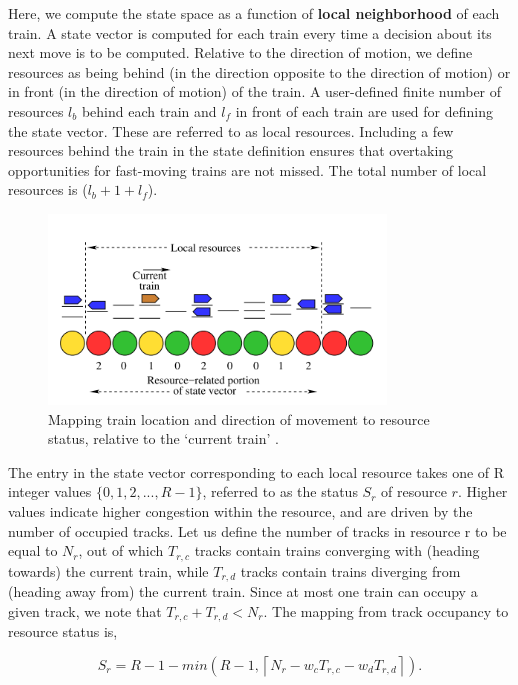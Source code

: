 Here, we compute the state space as a function of \textbf{local neighborhood} of each
train.
A state vector is computed for each train every time a
decision about its next move is to be computed. Relative to
the direction of motion, we define resources as being behind
(in the direction opposite to the direction of motion) or in
front (in the direction of motion) of the train. A user-defined
finite number of resources $ l_b $ behind each train and $ l_f $ in
front of each train are used for defining the state vector. These
are referred to as local resources. Including a few resources
behind the train in the state definition ensures that overtaking
opportunities for fast-moving trains are not missed. The total
number of local resources is ($ l_b + 1 + l_f $). 
\vspace{0.2cm}
\begin{figure}[h]
    \centering
    \includegraphics[width=0.8\textwidth]{report2}
    \caption{ Mapping train location and direction of movement to resource
    status, relative to the ‘current train’ \cite{ARTICLE:1}.  }
    \label{image-myimage}
\end{figure}


The entry in the state vector corresponding to each local
resource takes one of R integer values $ \{0, 1, 2,..., R-1\} $,
referred to as the status $S_r$ of resource $r$. Higher values
indicate higher congestion within the resource, and are driven
by the number of occupied tracks.
Let us define the number
of tracks in resource r to be equal to $N_r$, out of which $T_{r,c}$
tracks contain trains converging with (heading towards) the
current train, while $T_{r,d}$ tracks contain trains diverging from
(heading away from) the current train. Since at most one train
can occupy a given track, we note that $T_{r,c} + T_{r,d} < N_r$. The
mapping from track occupancy to resource status is,

$$ S_r = R - 1 - min(R - 1, \left \lceil{N_r - w_c T_{r,c} - w_d T_{r,d} }\right \rceil ).$$

